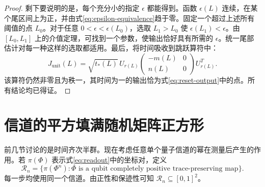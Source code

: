 \documentclass[UTF8,11pt,a4paper,fontset=fandol]{ctexart}
\theoremstyle{definition}
\theoremstyle{remark}
\begin{document}
\begin{proof}
剩下要说明的是，每个充分小的指定 \(\epsilon\) 都能得到。函数 \(\epsilon(L)\) 连续，在某个尾区间上为正，并由式\eqref{eq:epsilon-equivalence}趋于零。固定一个超过上述所有阈值的点 \(L_0\)。对于任意 \(0<\epsilon<\epsilon(L_0)\)，选取 \(L_1>L_0\) 使 \(\epsilon(L_1)<\epsilon\)。由 \([L_0,L_1]\) 上的介值定理，可找到一个参数，使输出恰好具有所需的 \(\epsilon\)。统一尾部估计对每一种这样的选取都适用。最后，将时间吸收到跳跃算符中：
\begin{equation}\label{eq:reset-actual-unit-jump}
 J_{\mathrm{unit}}(L)=\sqrt{t_*(L)}\,
 U_{r(L)}\begin{pmatrix}-m(L)&0\\n(L)&0\end{pmatrix}U_{r(L)}^T.
\end{equation}
该算符仍然非零且为秩一，其时间为一的输出恰为式\eqref{eq:reset-output}中的点。所有结论均已得证。
\end{proof}

\section{信道的平方填满随机矩阵正方形}\label{sec:roots}

前几节讨论的是时间齐次半群。现在考虑任意单个量子信道的幂在测量后产生的作用。若 \(\pi(\Phi)\) 表示式\eqref{eq:readout}中的坐标对，定义
\begin{equation}\label{eq:root-layer}
 \mathcal R_n=\{\pi(\Phi^n):\Phi\text{ is a qubit completely positive trace-preserving map}\}.
\end{equation}
每一步均使用同一个信道。由正性和保迹性可知 \(\mathcal R_n\subseteq[0,1]^2\)。
\end{document}

